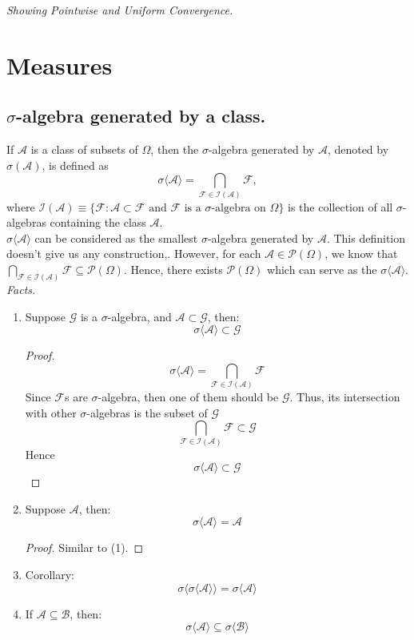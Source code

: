 \documentclass[11pt]{article}
\theoremstyle{definition}
\begin{document}
\noindent
\emph{Showing Pointwise and Uniform Convergence.}

\section{Measures}
\label{sec:measures}
\subsection{$\sigma$-algebra generated by a class.}
\label{subsec:measures:sigma-algebra-generated-class} If $\mathcal{A}$ is a class of subsets of $\Omega$, then the $\sigma$-algebra generated by $\mathcal{A}$, denoted by $\sigma(\mathcal{A})$, is defined as
\[
  \sigma \langle\mathcal{A}\rangle = \bigcap_{\mathcal{F} \in \mathcal{I}(\mathcal{A})} \mathcal{F},
\]
where $\mathcal{I}(\mathcal{A}) \equiv \{\mathcal{F} : \mathcal{A} \subset \mathcal{F} \text{ and } \mathcal{F} \text{ is a } \sigma\text{-algebra on } \Omega\}$ is the collection of all $\sigma$-algebras containing the class $\mathcal{A}$.
\\
$\sigma \langle\mathcal{A}\rangle$ can be considered as the smallest $\sigma$-algebra generated by $\mathcal{A}$. This definition doesn't give us any construction,. However, for each $\mathcal{A} \in \mathcal{P}(\Omega)$, we know that $\bigcap_{\mathcal{F} \in \mathcal{I}(\mathcal{A})} \mathcal{F} \subseteq \mathcal{P}(\Omega)$. Hence, there exists $\mathcal{P}(\Omega)$ which can serve as the $\sigma \langle\mathcal{A}\rangle$.
\\
\emph{Facts.}
\begin{enumerate}
    \item Suppose $\mathcal{G}$ is a $\sigma$-algebra, and $\mathcal{A} \subset \mathcal{G}$, then:
    \[\sigma \langle\mathcal{A}\rangle \subset \mathcal{G}\]
    \begin{proof}
       \[\sigma \langle\mathcal{A}\rangle = \bigcap_{\mathcal{F} \in \mathcal{I}(\mathcal{A})} \mathcal{F}\]
        Since $\mathcal{F}$s are $\sigma$-algebra, then one of them should be $\mathcal{G}$. Thus, its intersection with other $\sigma$-algebras is the subset of $\mathcal{G}$
        \[\bigcap_{\mathcal{F} \in \mathcal{I}(\mathcal{A})} \mathcal{F} \subset \mathcal{G}\]
        Hence
        \[\sigma \langle\mathcal{A}\rangle \subset \mathcal{G}\]
    \end{proof}
    \item Suppose $\mathcal{A}$, then:
    \[\sigma \langle\mathcal{A}\rangle = \mathcal{A}\]
    \begin{proof}
        Similar to (1).
    \end{proof}
    \item [] Corollary: 
    \[\sigma \langle \sigma\langle\mathcal{A}\rangle \rangle = \sigma \langle\mathcal{A}\rangle\]
    \item If $\mathcal{A} \subseteq \mathcal{B}$, then:
    \[\sigma \langle\mathcal{A}\rangle \subseteq \sigma \langle\mathcal{B}\rangle\]
\end{enumerate}
\end{document}
